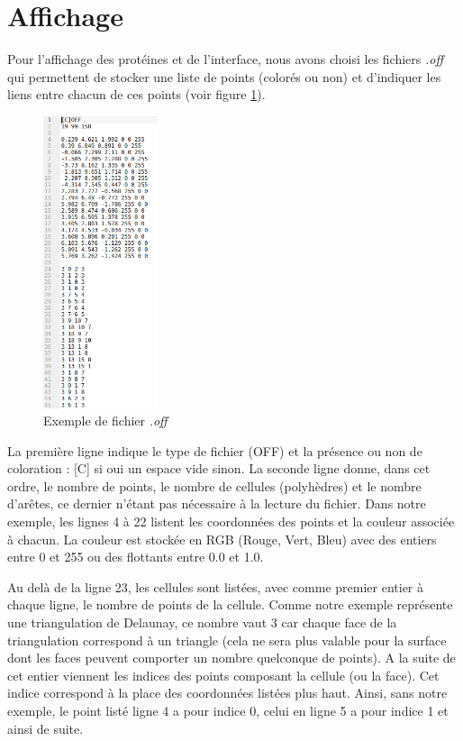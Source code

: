 \section{Affichage}

Pour l'affichage des protéines et de l'interface, nous avons choisi les fichiers
\textit{.off} qui permettent de stocker une liste de points (colorés ou non) et
d'indiquer les liens entre chacun de ces points (voir figure \ref{fig::off_file}).

\begin{figure}[ht]
\centering
  \includegraphics[width=0.3\textwidth]{figures/off_file.png}
  \caption{Exemple de fichier \textit{.off}}
  \label{fig::off_file}
\end{figure}

La première ligne indique le type de fichier (OFF) et la présence ou non de coloration :
[C] si oui un espace vide sinon. La seconde ligne donne, dans cet ordre, le nombre
de points, le nombre de cellules (polyhèdres) et le nombre d'arêtes, ce dernier n'étant
pas nécessaire à la lecture du fichier. Dans notre exemple, les lignes 4 à 22 listent
les coordonnées des points et la couleur associée à chacun. La couleur est stockée en RGB
(Rouge, Vert, Bleu) avec des entiers entre 0 et 255 ou des flottants entre 0.0 et 1.0.

Au delà de la ligne 23, les cellules sont listées, avec comme premier entier à chaque
ligne, le nombre de points de la cellule. Comme notre exemple représente une triangulation
de Delaunay, ce nombre vaut 3 car chaque face de la triangulation correspond à un
triangle (cela ne sera plus valable pour la surface dont les faces peuvent comporter un nombre
quelconque de points). A la suite de cet entier viennent les indices des points composant la cellule
(ou la face). Cet indice correspond à la place des coordonnées listées plus haut. Ainsi,
sans notre exemple, le point listé ligne 4 a pour indice 0, celui en ligne 5 a pour indice 1
et ainsi de suite.

